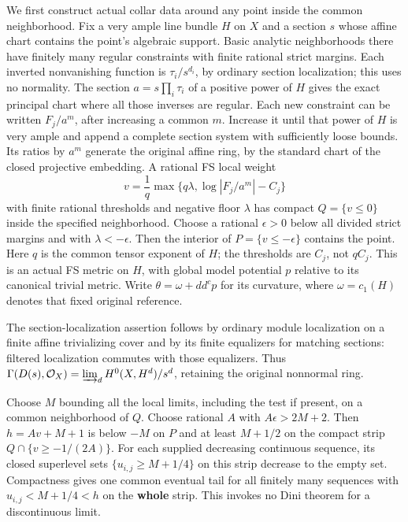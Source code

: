 \documentclass[
  10pt,
]{article}
\begin{document}
We first construct actual collar data around any point inside the common
neighborhood. Fix a very ample line bundle \(H\) on \(X\) and a section
\(s\) whose affine chart contains the point's algebraic support. Basic
analytic neighborhoods there have finitely many regular constraints with
finite rational strict margins. Each inverted nonvanishing function is
\(\tau_i/s^{d_i}\), by ordinary section localization; this uses no
normality. The section \(a=s\prod_i\tau_i\) of a positive power of \(H\)
gives the exact principal chart where all those inverses are regular.
Each new constraint can be written \(F_j/a^m\), after increasing a
common \(m\). Increase it until that power of \(H\) is very ample and
append a complete section system with sufficiently loose bounds. Its
ratios by \(a^m\) generate the original affine ring, by the standard
chart of the closed projective embedding. A rational FS local weight
\[v=\frac1q\max\{q\lambda,\log|F_j/a^m|-C_j\}\] with finite rational
thresholds and negative floor \(\lambda\) has compact \(Q=\{v\le0\}\)
inside the specified neighborhood. Choose a rational \(\epsilon>0\)
below all divided strict margins and with \(\lambda<-\epsilon\). Then
the interior of \(P=\{v\le-\epsilon\}\) contains the point. Here \(q\)
is the common tensor exponent of \(H\); the thresholds are \(C_j\), not
\(qC_j\). This is an actual FS metric on \(H\), with global model
potential \(p\) relative to its canonical trivial metric. Write
\(\theta=\omega+dd^cp\) for its curvature, where \(\omega=c_1(H)\)
denotes that fixed original reference.

The section-localization assertion follows by ordinary module
localization on a finite affine trivializing cover and by its finite
equalizers for matching sections: filtered localization commutes with
those equalizers. Thus
\(\Gamma(D(s),\mathcal O_X)=\varinjlim_d H^0(X,H^d)/s^d\), retaining the
original nonnormal ring.

Choose \(M\) bounding all the local limits, including the test if
present, on a common neighborhood of \(Q\). Choose rational \(A\) with
\(A\epsilon>2M+2\). Then \(h=Av+M+1\) is below \(-M\) on \(P\) and at
least \(M+1/2\) on the compact strip \(Q\cap\{v\ge-1/(2A)\}\). For each
supplied decreasing continuous sequence, its closed superlevel sets
\(\{u_{i,j}\ge M+1/4\}\) on this strip decrease to the empty set.
Compactness gives one common eventual tail for all finitely many
sequences with \(u_{i,j}<M+1/4<h\) on the \textbf{whole} strip. This
invokes no Dini theorem for a discontinuous limit.
\end{document}

